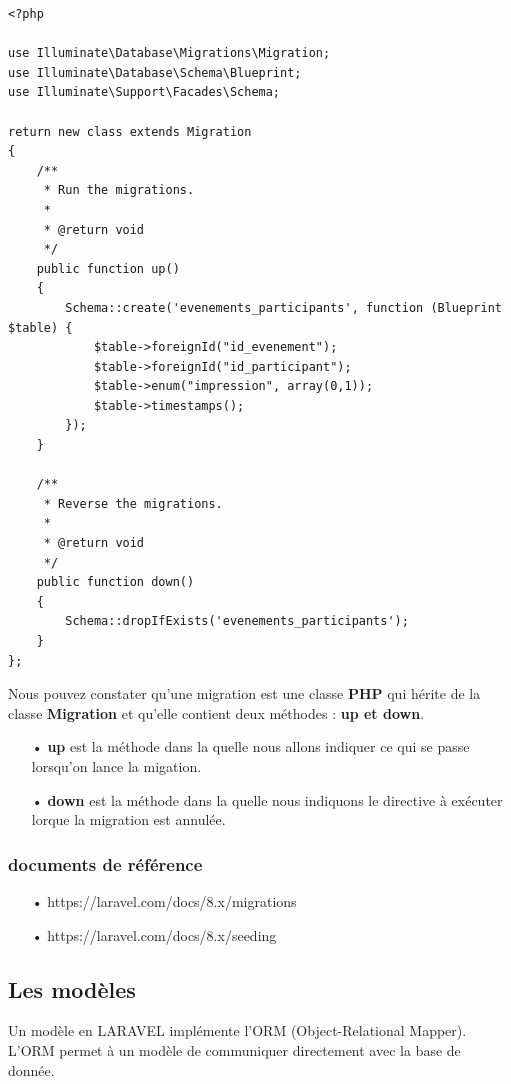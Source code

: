 \documentclass[12pt,a4paper]{article}
\begin{document}
\begin{itemize}
\begin{verbatim}
<?php

use Illuminate\Database\Migrations\Migration;
use Illuminate\Database\Schema\Blueprint;
use Illuminate\Support\Facades\Schema;

return new class extends Migration
{
    /**
     * Run the migrations.
     *
     * @return void
     */
    public function up()
    {
        Schema::create('evenements_participants', function (Blueprint $table) {
            $table->foreignId("id_evenement");
            $table->foreignId("id_participant");
            $table->enum("impression", array(0,1));
            $table->timestamps();
        });
    }

    /**
     * Reverse the migrations.
     *
     * @return void
     */
    public function down()
    {
        Schema::dropIfExists('evenements_participants');
    }
};

\end{verbatim}
\end{itemize}

Nous pouvez constater qu'une migration est une classe \textbf{PHP} qui hérite de la classe
\textbf{Migration} et qu'elle contient deux méthodes : \textbf{up et down}.

\begin{itemize}


\item[•] \textbf{up} est la méthode dans la quelle nous allons indiquer ce qui se passe lorsqu'on lance la migation.\\


\item[•] \textbf{down} est la méthode dans la quelle nous indiquons le directive à exécuter lorque la migration
est annulée.

\end{itemize}

\subsubsection{documents de référence}
\begin{itemize}
\item[•] https://laravel.com/docs/8.x/migrations
\item[•] https://laravel.com/docs/8.x/seeding
\end{itemize}

\subsection{Les modèles}
Un modèle en LARAVEL implémente l'ORM (Object-Relational Mapper). L'ORM permet à un modèle de  communiquer directement avec la base de donnée.\\
\end{document}

